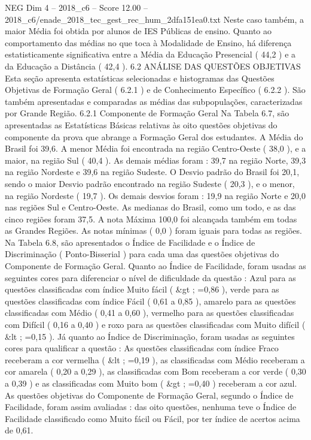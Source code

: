 \begin{textsample}{NEG Dim 4 – 2018\_c6 – Score 12.00 – 2018\_c6/enade\_2018\_tec\_gest\_rec\_hum\_2dfa151ea0.txt}
Neste caso também, a maior Média foi obtida por alunos de IES Públicas de ensino.
Quanto ao comportamento das médias no que toca à Modalidade de Ensino, há diferença estatisticamente significativa entre a Média da Educação Presencial ( 44,2 ) e a da Educação a Distância ( 42,4 ). 6.2 ANÁLISE DAS QUESTÕES OBJETIVAS Esta seção apresenta estatísticas selecionadas e histogramas das Questões Objetivas de Formação Geral ( 6.2.1 ) e de Conhecimento Específico ( 6.2.2 ).
São também apresentadas e comparadas as médias das subpopulações, caracterizadas por Grande Região. 6.2.1 Componente de Formação Geral Na Tabela 6.7, são apresentadas as Estatísticas Básicas relativas às oito questões objetivas do componente da prova que abrange a Formação Geral dos estudantes.
A Média do Brasil foi 39,6.
A menor Média foi encontrada na região Centro-Oeste ( 38,0 ), e a maior, na região Sul ( 40,4 ).
As demais médias foram : 39,7 na região Norte, 39,3 na região Nordeste e 39,6 na região Sudeste.
O Desvio padrão do Brasil foi 20,1, sendo o maior Desvio padrão encontrado na região Sudeste ( 20,3 ), e o menor, na região Nordeste ( 19,7 ).
Os demais desvios foram : 19,9 na região Norte e 20,0 nas regiões Sul e Centro-Oeste.
As medianas do Brasil, como um todo, e as das cinco regiões foram 37,5.
A nota Máxima 100,0 foi alcançada também em todas as Grandes Regiões.
As notas mínimas ( 0,0 ) foram iguais para todas as regiões.
Na Tabela 6.8, são apresentados o Índice de Facilidade e o Índice de Discriminação ( Ponto-Bisserial ) para cada uma das questões objetivas do Componente de Formação Geral.
Quanto ao Índice de Facilidade, foram usadas as seguintes cores para diferenciar o nível de dificuldade da questão : Azul para as questões classificadas com índice Muito fácil ( \&gt ; =0,86 ), verde para as questões classificadas com índice Fácil ( 0,61 a 0,85 ), amarelo para as questões classificadas com Médio ( 0,41 a 0,60 ), vermelho para as questões classificadas com Difícil ( 0,16 a 0,40 ) e roxo para as questões classificadas com Muito difícil ( \&lt ; =0,15 ).
Já quanto ao Índice de Discriminação, foram usadas as seguintes cores para qualificar a questão : As questões classificadas com índice Fraco receberam a cor vermelha ( \&lt ; =0,19 ), as classificadas com Médio receberam a cor amarela ( 0,20 a 0,29 ), as classificadas com Bom receberam a cor verde ( 0,30 a 0,39 ) e as classificadas com Muito bom ( \&gt ; =0,40 ) receberam a cor azul.
As questões objetivas do Componente de Formação Geral, segundo o Índice de Facilidade, foram assim avaliadas : das oito questões, nenhuma teve o Índice de Facilidade classificado como Muito fácil ou Fácil, por ter índice de acertos acima de 0,61.

\end{textsample}
